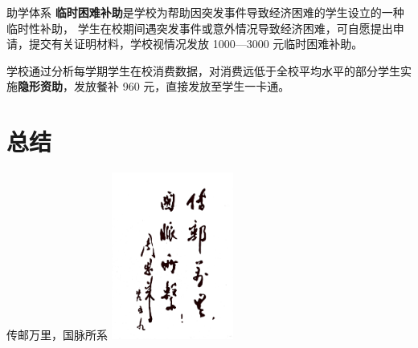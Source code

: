 \documentclass[aspectratio=169, utf8, fontset=windows]{beamer}
\begin{document}
\begin{frame}{助学体系}
    \textcolor{Fore}{\textbf{临时困难补助}}是学校为帮助因突发事件导致经济困难的学生设立的一种临时性补助，
    学生在校期间遇突发事件或意外情况导致经济困难，可自愿提出申请，提交有关证明材料，学校视情况发放 1000—3000 元临时困难补助。

    学校通过分析每学期学生在校消费数据，对消费远低于全校平均水平的部分学生实施\textcolor{Fore}{\textbf{隐形资助}}，发放餐补 960 元，直接发放至学生一卡通。
\end{frame}

\section*{总结}

\begin{frame}{传邮万里，国脉所系}
    \centering
    \includegraphics[width=0.3\textwidth]{./resources/30.png}
\end{frame}
\end{document}
